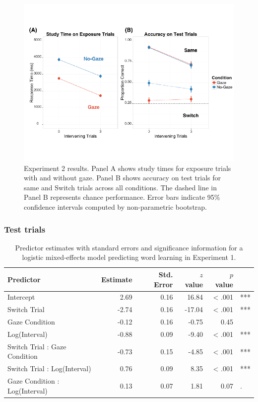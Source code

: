 \documentclass[a4paper,man,natbib]{apa6}
\newenvironment{CodeChunk}{}{}
\begin{document}
\begin{CodeChunk}
\begin{figure}
\includegraphics{figs/expt2-plot-1} \caption[Experiment 2 results]{Experiment 2 results. Panel A shows study times for exposure trials with and without gaze. Panel B shows accuracy on test trials for same and Switch trials across all conditions. The dashed line in Panel B represents chance performance. Error bars indicate 95\% confidence intervals computed by non-parametric bootstrap.}\label{fig:expt2-plot}
\end{figure}
\end{CodeChunk}

\subsubsection{Test trials}\label{test-trials-1}

\begin{table}[ht]
\centering
\caption{Predictor estimates with standard errors and significance information for a logistic mixed-effects model predicting word learning in Experiment 1.} 
\label{tab:exp1_reg}
\begin{tabular}{lrrrrl}
 Predictor & Estimate & Std. Error & $z$ value & $p$ value &  \\ 
  \hline
Intercept & 2.69 & 0.16 & 16.84 & < .001 & *** \\ 
  Switch Trial & -2.74 & 0.16 & -17.04 & < .001 & *** \\ 
  Gaze Condition & -0.12 & 0.16 & -0.75 & 0.45 &  \\ 
  Log(Interval) & -0.88 & 0.09 & -9.40 & < .001 & *** \\ 
  Switch Trial : Gaze Condition & -0.73 & 0.15 & -4.85 & < .001 & *** \\ 
  Switch Trial : Log(Interval) & 0.76 & 0.09 & 8.35 & < .001 & *** \\ 
  Gaze Condition : Log(Interval) & 0.13 & 0.07 & 1.81 & 0.07 & . \\ 
   \hline
\end{tabular}
\end{table}
\end{document}
